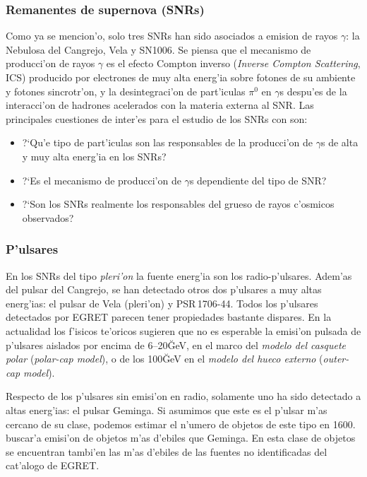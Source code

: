 \subsubsection*{Remanentes de supernova (SNRs)}
% 
Como ya se mencion'o, solo tres SNRs han sido asociados a emision de
rayos $\gamma$: la Nebulosa del Cangrejo, Vela y SN1006. Se piensa que
el mecanismo de producci'on de rayos $\gamma$ es el efecto Compton
inverso (\emph{Inverse Compton Scattering}, ICS) producido por
electrones de muy alta energ'ia sobre fotones de su ambiente y fotones
sincrotr'on, y la desintegraci'on de part'iculas $\pi^0$ en $\gamma$s
despu'es de la interacci'on de hadrones acelerados con la materia
externa al SNR. Las principales cuestiones de inter'es para el estudio
de los SNRs con \MAGIC son:
%
\begin{itemize}
\item ?`Qu'e tipo de part'iculas son las responsables de la
  producci'on de $\gamma$s de alta y muy alta energ'ia en los SNRs?
\item ?`Es el mecanismo de producci'on de $\gamma$s dependiente del
  tipo de SNR?
\item ?`Son los SNRs realmente los responsables del grueso de rayos
  c'osmicos observados?
\end{itemize}

\subsubsection*{P'ulsares} 
%
En los SNRs del tipo \emph{pleri'on} la fuente energ'ia son los
radio-p'ulsares. Adem'as del pulsar del Cangrejo, se han detectado
otros dos p'ulsares a muy altas energ'ias: el pulsar de Vela
(pleri'on) y PSR\,1706-44. Todos los p'ulsares detectados por EGRET
parecen tener propiedades bastante dispares. En la actualidad los
f'isicos te'oricos sugieren que no es esperable la emisi'on pulsada de
p'ulsares aislados por encima de 6--20\u{GeV}, en el marco del
\emph{modelo del casquete polar} (\emph{polar-cap model}), o de los
100\u{GeV} en el \emph{modelo del hueco externo} (\emph{outer-cap
model}). 

Respecto de los p'ulsares sin emisi'on en radio, solamente uno ha sido
detectado a altas energ'ias: el pulsar Geminga. Si asumimos que este
es el p'ulsar m'as cercano de su clase, podemos estimar el n'umero de
objetos de este tipo en 1600. \MAGIC buscar'a emisi'on de objetos m'as
d'ebiles que Geminga. En esta clase de objetos se encuentran tambi'en
las m'as d'ebiles de las fuentes no identificadas del cat'alogo de
EGRET.

